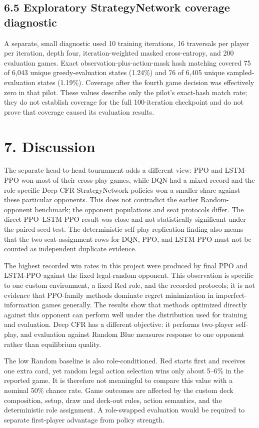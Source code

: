 \documentclass[11pt]{article}
\begin{document}
\subsection*{6.5 Exploratory StrategyNetwork coverage diagnostic}

A separate, small diagnostic used 10 training iterations, 16 traversals per player per iteration, depth four, iteration-weighted masked cross-entropy, and 200 evaluation games. Exact observation-plus-action-mask hash matching covered 75 of 6,043 unique greedy-evaluation states (1.24\%) and 76 of 6,405 unique sampled-evaluation states (1.19\%). Coverage after the fourth game decision was effectively zero in that pilot. These values describe only the pilot's exact-hash match rate; they do not establish coverage for the full 100-iteration checkpoint and do not prove that coverage caused its evaluation results.

\section*{7. Discussion}

The separate head-to-head tournament adds a different view: PPO and LSTM-PPO won most of their cross-play games, while DQN had a mixed record and the role-specific Deep CFR StrategyNetwork policies won a smaller share against these particular opponents. This does not contradict the earlier Random-opponent benchmark; the opponent populations and seat protocols differ. The direct PPO--LSTM-PPO result was close and not statistically significant under the paired-seed test. The deterministic self-play replication finding also means that the two seat-assignment rows for DQN, PPO, and LSTM-PPO must not be counted as independent duplicate evidence.

The highest recorded win rates in this project were produced by final PPO and LSTM-PPO against the fixed legal-random opponent. This observation is specific to one custom environment, a fixed Red role, and the recorded protocols; it is not evidence that PPO-family methods dominate regret minimization in imperfect-information games generally. The results show that methods optimized directly against this opponent can perform well under the distribution used for training and evaluation. Deep CFR has a different objective: it performs two-player self-play, and evaluation against Random Blue measures response to one opponent rather than equilibrium quality.

The low Random baseline is also role-conditioned. Red starts first and receives one extra card, yet random legal action selection wins only about 5--6\% in the reported game. It is therefore not meaningful to compare this value with a nominal 50\% chance rate. Game outcomes are affected by the custom deck composition, setup, draw and deck-out rules, action semantics, and the deterministic role assignment. A role-swapped evaluation would be required to separate first-player advantage from policy strength.
\end{document}
